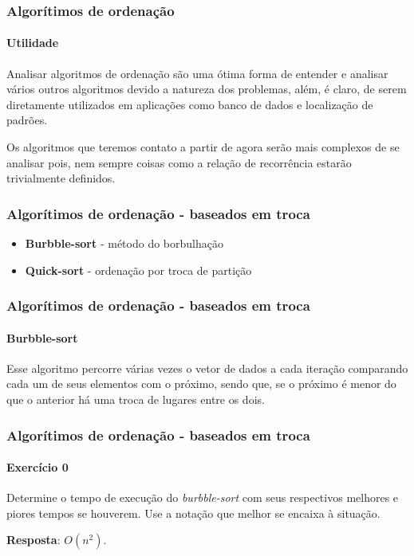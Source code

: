\begin{frame}
	\frametitle{Algorítimos de ordenação}
	\framesubtitle{Utilidade}
	\par Analisar algoritmos de ordenação são uma ótima forma de entender e analisar vários outros algoritmos devido a natureza dos problemas, além, é claro, de serem diretamente utilizados em aplicações como banco de dados e localização de padrões.\newline
	
	\par Os algoritmos que teremos contato a partir de agora serão mais complexos de se analisar pois, nem sempre coisas como a relação de recorrência estarão trivialmente definidos.
\end{frame}

\begin{frame}
	\frametitle{Algorítimos de ordenação - baseados em troca}
	\begin{itemize}
		\item \textbf{Burbble-sort} - método do borbulhação
		\item \textbf{Quick-sort} - ordenação por troca de partição
	\end{itemize}
\end{frame}

\begin{frame}
	\frametitle{Algorítimos de ordenação - baseados em troca}
	\framesubtitle{Burbble-sort}
	\par Esse algoritmo percorre várias vezes o vetor de dados a cada iteração comparando cada um de seus elementos com o próximo, sendo que,  se o próximo é menor do que o anterior há uma troca de lugares entre os dois.
	
\end{frame}

\begin{frame}
	\frametitle{Algorítimos de ordenação - baseados em troca}
	\framesubtitle{Exercício 0}
	\par Determine o tempo de execução do \textit{burbble-sort} com seus respectivos melhores e piores tempos se houverem. Use a notação que melhor se encaixa à situação.
	\pause
	\par \textbf{Resposta}: $O(n^2)$.
\end{frame}

